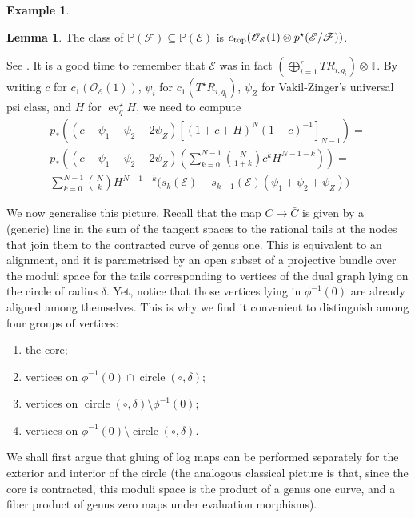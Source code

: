 \documentclass[11pt]{amsart}
\newcommand{\PP}{\mathbb P}
\newcommand{\st}{\star}
\newcommand{\OO}{\mathcal{O}}
\renewcommand{\to}{\rightarrow}
\newcommand{\ev}{\operatorname{ev}}
\theoremstyle{definition}
\newtheorem{lem}[thm]{Lemma}
\theoremstyle{definition}
\newtheorem{ex}[thm]{Example}
\begin{document}
\begin{ex}
\begin{lem}
 The class of $\PP(\mathcal F)\subseteq\PP(\mathcal E)$ is $c_{\rm{top}}(\OO_\mathcal{E}(1)\otimes p^\st(\mathcal{E}/\mathcal{F}))$.
\end{lem}
See \cite[Prop. 9.13]{EH3264}. It is a good time to remember that $\mathcal E$ was in fact $(\bigoplus_{i=1}^rTR_{i,q_i})\otimes\mathbb T$. By writing $c$ for $c_1(\OO_\mathcal{E}(1))$, $\psi_i$ for $c_1(T^\st R_{i,q_i})$, $\psi_Z$ for Vakil-Zinger's universal psi class, and $H$ for $\ev_q^\st H$, we need to compute
\begin{align*}
p_*\left((c-\psi_1-\psi_2-2\psi_Z)[(1+c+H)^N(1+c)^{-1}]_{N-1}\right)= \\
p_*\left((c-\psi_1-\psi_2-2\psi_Z)(\sum_{k=0}^{N-1}\binom{N}{1+k}c^kH^{N-1-k})\right)=\\
\sum_{k=0}^{N-1}\binom{N}{k}H^{N-1-k}\big(s_k(\mathcal E)-s_{k-1}(\mathcal E)(\psi_1+\psi_2+\psi_Z)\big)
\end{align*}
\end{ex}

We now generalise this picture. Recall that the map $C\to\bar C$ is given by a (generic) line in the sum of the tangent spaces to the rational tails at the nodes that join them to the contracted curve of genus one. This is equivalent to an alignment, and it is parametrised by an open subset of a projective bundle over the moduli space for the tails corresponding to vertices of the dual graph lying on the circle of radius $\delta$. Yet, notice that those vertices lying in $\phi^{-1}(0)$ are already aligned among themselves. This is why we find it convenient to distinguish among four groups of vertices:
\begin{enumerate}
 \item the core;
 \item\label{specialvertices} vertices on $\phi^{-1}(0)\cap\operatorname{circle}(\circ,\delta)$;
 \item vertices on $\operatorname{circle}(\circ,\delta)\setminus\phi^{-1}(0)$;
 \item\label{boringvertices} vertices on $\phi^{-1}(0)\setminus\operatorname{circle}(\circ,\delta)$.
\end{enumerate}
We shall first argue that gluing of log maps can be performed separately for the exterior and interior of the circle (the analogous classical picture is that, since the core is contracted, this moduli space is the product of a genus one curve, and a fiber product of genus zero maps under evaluation morphisms).
\end{document}
